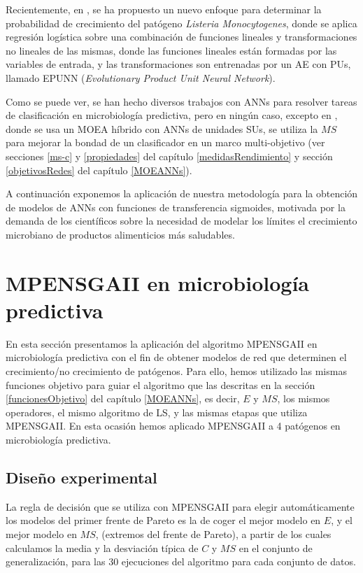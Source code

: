 Recientemente, en \cite{Valero2007b}, se ha propuesto un nuevo enfoque para determinar la
probabilidad de crecimiento del patógeno \textit{Listeria Monocytogenes}, donde se aplica regresión
logística sobre una combinación de funciones lineales y transformaciones no lineales
de las mismas, donde las funciones lineales están formadas por las variables de
entrada, y las transformaciones son entrenadas por un AE con PUs, llamado EPUNN
(\textit{Evolutionary Product Unit Neural Network}).

Como se puede ver, se han hecho diversos trabajos con ANNs para resolver tareas
de clasificación en microbiología predictiva, pero en ningún caso, excepto en
\cite{Fernandez2008}, donde se usa un MOEA híbrido con ANNs de unidades SUs, se utiliza la
$MS$ para
mejorar la bondad de un clasificador en un marco multi-objetivo (ver
secciones \ref{ms-c} y \ref{propiedades} del capítulo
\ref{medidasRendimiento} y sección \ref{objetivosRedes} del capítulo \ref{MOEANNs}).

A continuación exponemos
la aplicación de nuestra metodología para la obtención de modelos de ANNs con funciones
de transferencia sigmoides, motivada por la demanda de los científicos sobre la necesidad de
modelar los límites el crecimiento microbiano de productos alimenticios más saludables.

\section{MPENSGAII en microbiología predictiva}
\noindent En esta sección presentamos la aplicación del algoritmo MPENSGAII en
microbiología predictiva \cite{Fernandez2009c} con el fin de obtener modelos de red que determinen
el crecimiento/no crecimiento de patógenos. Para ello, hemos utilizado
las mismas funciones objetivo para guiar el algoritmo que las descritas en la sección
\ref{funcionesObjetivo} del capítulo \ref{MOEANNs}, es decir, $E$ y
$MS$, los mismos operadores, el mismo algoritmo de LS, y las mismas etapas que utiliza
MPENSGAII. En esta ocasión hemos aplicado MPENSGAII a 4 patógenos en
microbiología predictiva.

\subsection{Diseño experimental}\label{disenioExperimental}
\noindent La regla de decisión que se utiliza con MPENSGAII para elegir automáticamente los modelos
del primer frente de Pareto es la de coger el mejor modelo en $E$,
y el mejor modelo en $MS$, (extremos del frente de Pareto), a partir de los
cuales calculamos la media y la desviación típica de $C$ y $MS$ en el conjunto de generalización,
para las 30 ejecuciones del algoritmo para cada conjunto de datos.

